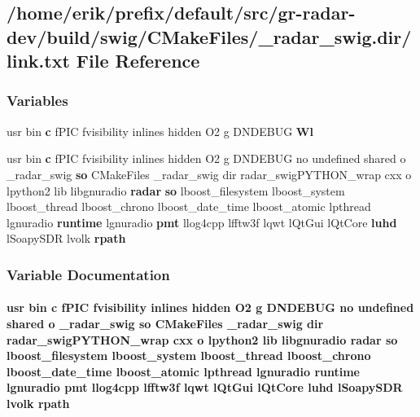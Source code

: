 \subsection{/home/erik/prefix/default/src/gr-\/radar-\/dev/build/swig/\+C\+Make\+Files/\+\_\+radar\+\_\+swig.dir/link.txt File Reference}
\label{gr-radar-dev_2build_2swig_2CMakeFiles_2__radar__swig_8dir_2link_8txt}
\subsubsection*{Variables}
\begin{DoxyCompactItemize}
\item 
usr bin {\bf c} f\+P\+IC fvisibility inlines hidden O2 g D\+N\+D\+E\+B\+UG {\bf Wl}
\item 
usr bin {\bf c} f\+P\+IC fvisibility inlines hidden O2 g D\+N\+D\+E\+B\+UG no undefined shared o \+\_\+radar\+\_\+swig {\bf so} C\+Make\+Files \+\_\+radar\+\_\+swig dir radar\+\_\+swig\+P\+Y\+T\+H\+O\+N\+\_\+wrap cxx o lpython2 lib libgnuradio {\bf radar} {\bf so} lboost\+\_\+filesystem lboost\+\_\+system lboost\+\_\+thread lboost\+\_\+chrono lboost\+\_\+date\+\_\+time lboost\+\_\+atomic lpthread lgnuradio {\bf runtime} lgnuradio {\bf pmt} llog4cpp lfftw3f lqwt l\+Qt\+Gui l\+Qt\+Core {\bf luhd} l\+Soapy\+S\+DR lvolk {\bf rpath}
\end{DoxyCompactItemize}


\subsubsection{Variable Documentation}
\paragraph[{rpath}]{\setlength{\rightskip}{0pt plus 5cm}usr bin {\bf c} f\+P\+IC fvisibility inlines hidden O2 g D\+N\+D\+E\+B\+UG no undefined shared o \+\_\+radar\+\_\+swig {\bf so} C\+Make\+Files \+\_\+radar\+\_\+swig dir radar\+\_\+swig\+P\+Y\+T\+H\+O\+N\+\_\+wrap cxx o lpython2 lib libgnuradio {\bf radar} {\bf so} lboost\+\_\+filesystem lboost\+\_\+system lboost\+\_\+thread lboost\+\_\+chrono lboost\+\_\+date\+\_\+time lboost\+\_\+atomic lpthread lgnuradio {\bf runtime} lgnuradio {\bf pmt} llog4cpp lfftw3f lqwt l\+Qt\+Gui l\+Qt\+Core {\bf luhd} l\+Soapy\+S\+DR lvolk rpath}\label{gr-radar-dev_2build_2swig_2CMakeFiles_2__radar__swig_8dir_2link_8txt_aad8c6fd56e1341390a55cbdaa53481e8}


